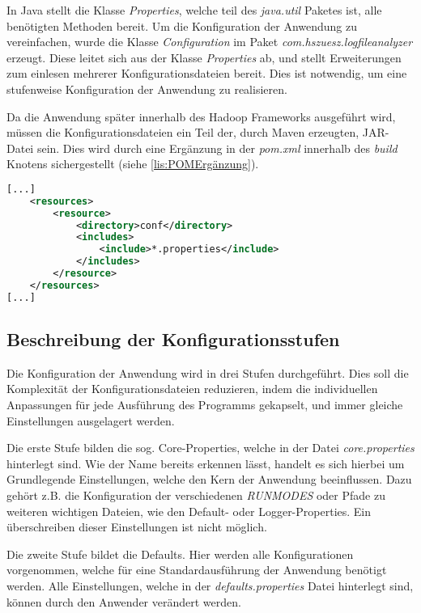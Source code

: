 In Java stellt die Klasse \textit{Properties}, welche teil des \textit{java.util} Paketes ist, alle benötigten Methoden bereit. Um die Konfiguration der Anwendung zu vereinfachen, wurde die Klasse \textit{Configuration} im Paket \textit{com.hszuesz.logfileanalyzer} erzeugt. Diese leitet sich aus der Klasse \textit{Properties} ab, und stellt Erweiterungen zum einlesen mehrerer Konfigurationsdateien bereit. Dies ist notwendig, um eine stufenweise Konfiguration der Anwendung zu realisieren.

Da die Anwendung später innerhalb des Hadoop Frameworks ausgeführt wird, müssen die Konfigurationsdateien ein Teil der, durch Maven erzeugten, JAR-Datei sein. Dies wird durch eine Ergänzung in der \textit{pom.xml} innerhalb des \textit{build} Knotens sichergestellt (siehe \autoref{lis:POMErgänzung}). \\

\begin{lstlisting}[language=XML,caption=pom.xml Ergänzung für Konfigurationsdateien,label=lis:POMErgänzung]
[...]
	<resources>
		<resource>
			<directory>conf</directory>
			<includes>
				<include>*.properties</include>
			</includes>
		</resource>
	</resources>
[...]
\end{lstlisting}

\subsection{Beschreibung der Konfigurationsstufen}
Die Konfiguration der Anwendung wird in drei Stufen durchgeführt. Dies soll die Komplexität der Konfigurationsdateien reduzieren, indem die individuellen Anpassungen für jede Ausführung des Programms gekapselt, und immer gleiche Einstellungen ausgelagert werden.

Die erste Stufe bilden die sog. Core-Properties, welche in der Datei \textit{core.properties} hinterlegt sind. Wie der Name bereits erkennen lässt, handelt es sich hierbei um Grundlegende Einstellungen, welche den Kern der Anwendung beeinflussen. Dazu gehört z.B. die Konfiguration der verschiedenen \textit{RUNMODES} oder Pfade zu weiteren wichtigen Dateien, wie den Default- oder Logger-Properties. Ein überschreiben dieser Einstellungen ist nicht möglich.

Die zweite Stufe bildet die Defaults. Hier werden alle Konfigurationen vorgenommen, welche für eine Standardausführung der Anwendung benötigt werden. Alle Einstellungen, welche in der \textit{defaults.properties} Datei hinterlegt sind, können durch den Anwender verändert werden.

